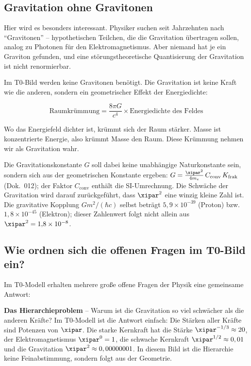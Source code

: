 	\subsection{Gravitation ohne Gravitonen}
	
	Hier wird es besonders interessant. Physiker suchen seit Jahrzehnten nach ``Gravitonen'' -- hypothetischen Teilchen, die die Gravitation übertragen sollen, analog zu Photonen für den Elektromagnetismus. Aber niemand hat je ein Graviton gefunden, und eine störungstheoretische Quantisierung der Gravitation ist nicht renormierbar.
	
	\begin{revolutionary}
		Im T0-Bild werden keine Gravitonen benötigt. Die Gravitation ist keine Kraft wie die anderen, sondern ein geometrischer Effekt der Energiedichte:
		
		\begin{equation}
			\text{Raumkrümmung} = \frac{8\pi G}{c^4} \times \text{Energiedichte des Feldes}
		\end{equation}
		
		Wo das Energiefeld dichter ist, krümmt sich der Raum stärker. Masse ist konzentrierte Energie, also krümmt Masse den Raum. Diese Krümmung nehmen wir als Gravitation wahr.
	\end{revolutionary}
	
	Die Gravitationskonstante $G$ soll dabei keine unabhängige Naturkonstante sein, sondern sich aus der geometrischen Konstante ergeben: $G = \frac{\xipar^2}{4m_e}\,C_{\text{conv}}\,K_{\text{frak}}$ (Dok.~012); der Faktor $C_{\text{conv}}$ enthält die SI-Umrechnung. Die Schwäche der Gravitation wird darauf zurückgeführt, dass $\xipar^2$ eine winzig kleine Zahl ist. Die gravitative Kopplung $Gm^2/(\hbar c)$ selbst beträgt $5{,}9\times10^{-39}$ (Proton) bzw.\ $1{,}8\times10^{-45}$ (Elektron); dieser Zahlenwert folgt nicht allein aus $\xipar^2 = 1{,}8\times10^{-8}$.
	
	\subsection{Wie ordnen sich die offenen Fragen im T0-Bild ein?}
	
	Im T0-Modell erhalten mehrere große offene Fragen der Physik eine gemeinsame Antwort:
	
	\textbf{Das Hierarchieproblem} -- Warum ist die Gravitation so viel schwächer als die anderen Kräfte? Im T0-Modell ist die Antwort einfach: Die Stärken aller Kräfte sind Potenzen von $\xipar$. Die starke Kernkraft hat die Stärke $\xipar^{-1/3} \approx 20$, der Elektromagnetismus $\xipar^0 = 1$, die schwache Kernkraft $\xipar^{1/2} \approx 0,01$ und die Gravitation $\xipar^2 \approx 0,00000001$. In diesem Bild ist die Hierarchie keine Feinabstimmung, sondern folgt aus der Geometrie.
	
